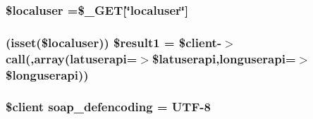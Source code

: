 \subsubsection[{\$localuser}]{\setlength{\rightskip}{0pt plus 5cm}\$localuser =\$\+\_\+\+G\+E\+T\mbox{[}\char`\"{}localuser\char`\"{}\mbox{]}}\label{_user_search_8php_a9af1c877a1e07b9c9a05a716088d9ee9}
\hypertarget{_user_search_8php_a4f9e1bf408dc2a45246e566d5696ce64}{}
\subsubsection[{\$result1}]{ (isset(\$localuser)) \$result1 = \$client-\/$>$call(\textquotesingle{},array(\textquotesingle{}latuserapi\textquotesingle{}=$>$\$latuserapi,\textquotesingle{}longuserapi\textquotesingle{}=$>$\$longuserapi))}\label{_user_search_8php_a4f9e1bf408dc2a45246e566d5696ce64}
\hypertarget{_user_search_8php_a944cce1b9c1aa5e93c77ace20ce99989}{}
\subsubsection[{soap\+\_\+defencoding}]{\setlength{\rightskip}{0pt plus 5cm}\$client soap\+\_\+defencoding = \textquotesingle{}U\+T\+F-\/8\textquotesingle{}}\label{_user_search_8php_a944cce1b9c1aa5e93c77ace20ce99989}
